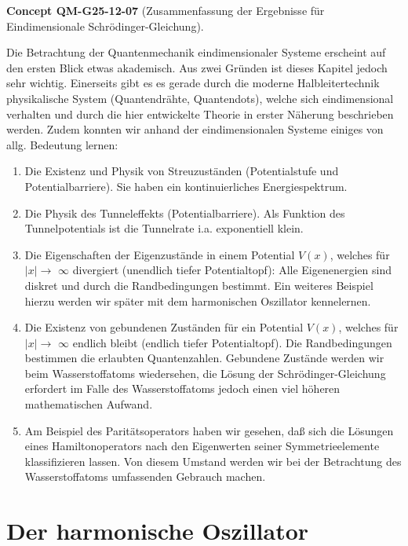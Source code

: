 \documentclass[10pt, letterpaper]{article}
\newcommand{\CustomHeading}[3]{%
  \par\medskip\noindent%
  \textbf{#1 #2} \textnormal{(#3)}.\enskip%
}
\newenvironment{CONC}[2]{\begin{unitbox}\CustomHeading{Concept}{#1}{#2}}{\end{unitbox}}
\begin{document}
\begin{CONC}{QM-G25-12-07}{Zusammenfassung der Ergebnisse für Eindimensionale Schrödinger-Gleichung}
Die Betrachtung der Quantenmechanik eindimensionaler Systeme erscheint auf den ersten Blick etwas akademisch. Aus zwei Gründen ist dieses Kapitel jedoch sehr wichtig. Einerseits gibt es es gerade durch die moderne Halbleitertechnik physikalische System (Quantendrähte, Quantendots), welche sich eindimensional verhalten und durch die hier entwickelte Theorie in erster Näherung beschrieben werden. Zudem konnten wir anhand der eindimensionalen Systeme einiges von allg. Bedeutung lernen:

\begin{enumerate}
  \item Die Existenz und Physik von Streuzuständen (Potentialstufe und Potentialbarriere). Sie haben ein kontinuierliches Energiespektrum.
  \item Die Physik des Tunneleffekts (Potentialbarriere). Als Funktion des Tunnelpotentials ist die Tunnelrate i.a. exponentiell klein.
  \item Die Eigenschaften der Eigenzustände in einem Potential $V(x)$, welches für $|x| \rightarrow$ $\infty$ divergiert (unendlich tiefer Potentialtopf): Alle Eigenenergien sind diskret und durch die Randbedingungen bestimmt. Ein weiteres Beispiel hierzu werden wir später mit dem harmonischen Oszillator kennelernen.
  \item Die Existenz von gebundenen Zuständen für ein Potential $V(x)$, welches für $|x| \rightarrow$ $\infty$ endlich bleibt (endlich tiefer Potentialtopf). Die Randbedingungen bestimmen die erlaubten Quantenzahlen. Gebundene Zustände werden wir beim Wasserstoffatoms wiedersehen, die Lösung der Schrödinger-Gleichung erfordert im Falle des Wasserstoffatoms jedoch einen viel höheren mathematischen Aufwand.
  \item Am Beispiel des Paritätsoperators haben wir gesehen, daß sich die Lösungen eines Hamiltonoperators nach den Eigenwerten seiner Symmetrieelemente klassifizieren lassen. Von diesem Umstand werden wir bei der Betrachtung des Wasserstoffatoms umfassenden Gebrauch machen.
\end{enumerate}
\end{CONC}








\pagebreak




\section{Der harmonische Oszillator}
\end{document}
